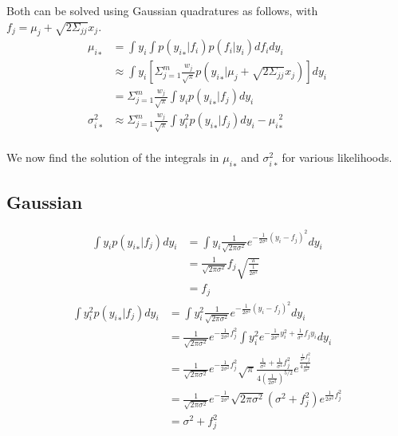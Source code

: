 \documentclass[5p,11pt]{article}
\begin{document}
Both can be solved using Gaussian quadratures as follows, with $f_j = \mu_j+\sqrt{2\Sigma_{jj}}x_j$.
\begin{equation}
    \begin{aligned}
        {\mu_i}_* &= \int y_i \int p({y_i}_*|f_i) p(f_i|y_i) df_i dy_i\\
        &\approx \int y_i \left[ \Sigma_{j=1}^m \frac{w_j}{\sqrt{\pi}} p({y_i}_*|\mu_j+\sqrt{2\Sigma_{jj}}x_j) \right ] dy_i \\
        &= \Sigma_{j=1}^m \frac{w_j}{\sqrt{\pi}} \int y_i p({y_i}_*|f_j) dy_i\\
        {\sigma^2_i}_* &\approx \Sigma_{j=1}^m \frac{w_j}{\sqrt{\pi}} \int y_i^2 p({y_i}_*|f_j) dy_i - {\mu_i}^2_*\\
    \end{aligned}
\end{equation}

We now find the solution of the integrals in ${\mu_i}_*$ and ${\sigma^2_i}_*$ for various likelihoods.

\subsection{Gaussian}
\begin{equation}
    \begin{aligned}
        \int y_i p({y_i}_*|f_j) dy_i &= \int y_i \frac{1}{\sqrt{2\pi\sigma^2}}e^{-\frac{1}{2\sigma^2}(y_i-f_j)^2} dy_i\\
        &= \frac{1}{\sqrt{2\pi\sigma^2}}f_j\sqrt{\frac{\pi}{\frac{1}{2\sigma^2}}}\\
        &= f_j
     \end{aligned}
\end{equation}
\begin{equation}
    \begin{aligned}
        \int y_i^2 p({y_i}_*|f_j) dy_i &= \int y_i^2 \frac{1}{\sqrt{2\pi\sigma^2}}e^{-\frac{1}{2\sigma^2}(y_i-f_j)^2} dy_i\\
        &= \frac{1}{\sqrt{2\pi\sigma^2}}e^{-\frac{1}{2\sigma^2}f_j^2}\int y_i^2e^{-\frac{1}{2\sigma^2}y_i^2 + \frac{1}{\sigma^2}f_jy_i}dy_i\\
        &= \frac{1}{\sqrt{2\pi\sigma^2}}e^{-\frac{1}{2\sigma^2}f_j^2} \sqrt{\pi}\frac{\frac{1}{\sigma^2}+\frac{1}{\sigma^4}f_j^2}{4(\frac{1}{2\sigma^2})^{5/2}}e^{\frac{\frac{1}{\sigma^4}f_j^2}{4\frac{1}{2\sigma^2}}}\\
        &= \frac{1}{\sqrt{2\pi\sigma^2}}e^{-\frac{1}{2\sigma^2}} \sqrt{2\pi\sigma^2}(\sigma^2+f_j^2)e^{\frac{1}{2\sigma^2}f_j^2}\\
        &= \sigma^2 + f_j^2
     \end{aligned}
\end{equation}
\end{document}

